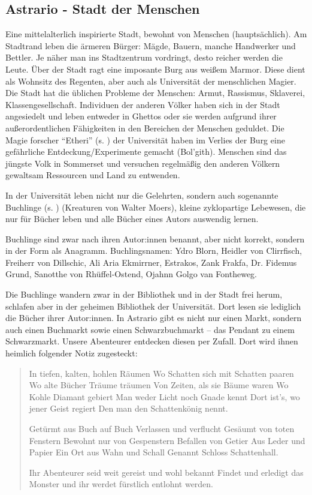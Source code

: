 \documentclass[11pt, twoside]{article}
\begin{document}
\subsection{Astrario - Stadt der Menschen}
\label{sec:orgd8c92c2}
Eine mittelalterlich inspirierte Stadt, bewohnt von Menschen (hauptsächlich). Am Stadtrand leben die ärmeren Bürger: Mägde, Bauern, manche Handwerker und Bettler. Je näher man ins Stadtzentrum vordringt, desto reicher werden die Leute. Über der Stadt ragt eine imposante Burg aus weißem Marmor. Diese dient als Wohnsitz des Regenten, aber auch als Universität der menschlichen Magier. Die Stadt hat die üblichen Probleme der Menschen: Armut, Rassismus, Sklaverei, Klassengesellschaft. Individuen der anderen Völker haben sich in der Stadt angesiedelt und leben entweder in Ghettos oder sie werden aufgrund ihrer außerordentlichen Fähigkeiten in den Bereichen der Menschen geduldet. Die Magie forscher ``Etheri'' (s. \pageref{etheri}) der Universität haben im Verlies der Burg eine gefährliche Entdeckung/Experimente gemacht (Bol'gith). Menschen sind das jüngste Volk in Sommerset und versuchen regelmäßig den anderen Völkern gewaltsam Ressourcen und Land zu entwenden.

In der Universität leben nicht nur die Gelehrten, sondern auch sogenannte Buchlinge (s. \pageref{buchling}) (Kreaturen von Walter Moers), kleine zyklopartige Lebewesen, die nur für Bücher leben und alle Bücher eines Autors auswendig lernen.

Buchlinge sind zwar nach ihren Autor:innen benannt, aber nicht korrekt, sondern in der Form als Anagramm.
Buchlingsnamen: Ydro Blorn, Heidler von Clirrfisch, Freiherr von Dillschic, Ali Aria Ekmirrner, Estrakos, Zank Frakfa, Dr. Fidemus Grund, Sanotthe von Rhüffel-Ostend, Ojahnn Golgo van Fontheweg.

Die Buchlinge wandern zwar in der Bibliothek und in der Stadt frei herum, schlafen aber in der geheimen Bibliothek der Universität. Dort lesen sie lediglich die Bücher ihrer Autor:innen. In Astrario gibt es nicht nur einen Markt, sondern auch einen Buchmarkt sowie einen Schwarzbuchmarkt – das Pendant zu einem Schwarzmarkt. Unsere Abenteurer entdecken diesen per Zufall. Dort wird ihnen heimlich folgender Notiz zugesteckt:
\begin{quote}
In tiefen, kalten, hohlen Räumen
Wo Schatten sich mit Schatten paaren
Wo alte Bücher Träume träumen
Von Zeiten, als sie Bäume waren
Wo Kohle Diamant gebiert
Man weder Licht noch Gnade kennt
Dort ist’s, wo jener Geist regiert
Den man den Schattenkönig nennt.

Getürmt aus Buch auf Buch
Verlassen und verflucht
Gesäumt von toten Fenstern
Bewohnt nur von Gespenstern
Befallen von Getier
Aus Leder und Papier
Ein Ort aus Wahn und Schall
Genannt Schloss Schattenhall.

Ihr Abenteurer seid weit gereist und wohl bekannt Findet und erledigt das Monster und ihr werdet fürstlich entlohnt werden.
\end{quote}
\end{document}
